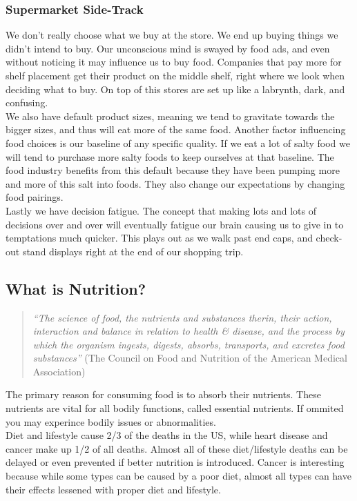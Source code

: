 \documentclass[letterpaper, 11pt]{article}
\begin{document}
\subsubsection{Supermarket Side-Track}
\label{sec:orgbdbb060}
We don't really choose what we buy at the store. We end up buying things we didn't intend to buy. Our unconscious mind is swayed by food ads, and even without noticing it may influence us to buy food. Companies that pay more for shelf placement get their product on the middle shelf, right where we look when deciding what to buy. On top of this stores are set up like a labrynth, dark, and confusing.\\
We also have default product sizes, meaning we tend to gravitate towards the bigger sizes, and thus will eat more of the same food. Another factor influencing food choices is our baseline of any specific quality. If we eat a lot of salty food we will tend to purchase more salty foods to keep ourselves at that baseline. The food industry benefits from this default because they have been pumping more and more of this salt into foods. They also change our expectations by changing food pairings.\\
Lastly we have decision fatigue. The concept that making lots and lots of decisions over and over will eventually fatigue our brain causing us to give in to temptations much quicker. This plays out as we walk past end caps, and check-out stand displays right at the end of our shopping trip.\\
\subsection{What is Nutrition?}
\label{sec:org11425e2}
\begin{quote}
\emph{``The science of food, the nutrients and substances therin, their action, interaction and balance in relation to health \& disease, and the process by which the organism ingests, digests, absorbs, transports, and excretes food substances''} (The Council on Food and Nutrition of the American Medical Association)\\
\end{quote}
The primary reason for consuming food is to absorb their nutrients. These nutrients are vital for all bodily functions, called essential nutrients. If ommited you may experince bodily issues or abnormalities.\\
Diet and lifestyle cause 2/3 of the deaths in the US, while heart disease and cancer make up 1/2 of all deaths. Almost all of these diet/lifestyle deaths can be delayed or even prevented if better nutrition is introduced. Cancer is interesting because while some types can be caused by a poor diet, almost all types can have their effects lessened with proper diet and lifestyle.\\
\end{document}
